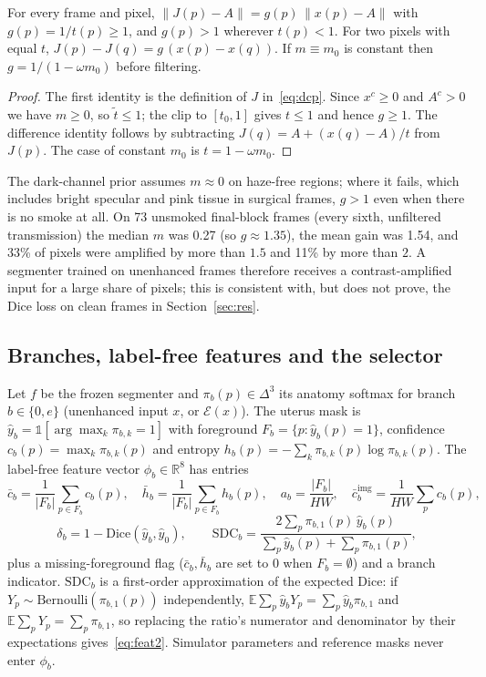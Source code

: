 \documentclass{midl}
\begin{document}
\begin{proposition}\label{prop:dcp}
For every frame and pixel, $\|J(p)-A\|=g(p)\,\|x(p)-A\|$ with $g(p)=1/t(p)\ge 1$, and $g(p)>1$ wherever $t(p)<1$. For two pixels with equal $t$, $J(p)-J(q)=g\,(x(p)-x(q))$. If $m\equiv m_0$ is constant then $g=1/(1-\omega m_0)$ before filtering.
\end{proposition}
\begin{proof}
The first identity is the definition of $J$ in~\eqref{eq:dcp}. Since $x^{c}\ge 0$ and $A^{c}>0$ we have $m\ge 0$, so $\tilde t\le 1$; the clip to $[t_0,1]$ gives $t\le 1$ and hence $g\ge 1$. The difference identity follows by subtracting $J(q)=A+(x(q)-A)/t$ from $J(p)$. The case of constant $m_0$ is $t=1-\omega m_0$.
\end{proof}
\noindent The dark-channel prior assumes $m\approx 0$ on haze-free regions; where it fails, which includes bright specular and pink tissue in surgical frames, $g>1$ even when there is no smoke at all. On 73 unsmoked final-block frames (every sixth, unfiltered transmission) the median $m$ was 0.27 (so $g\approx1.35$), the mean gain was 1.54, and 33\% of pixels were amplified by more than $1.5$ and 11\% by more than $2$. A segmenter trained on unenhanced frames therefore receives a contrast-amplified input for a large share of pixels; this is consistent with, but does not prove, the Dice loss on clean frames in Section~\ref{sec:res}.

\subsection{Branches, label-free features and the selector}
Let $f$ be the frozen segmenter and $\pi_b(p)\in\Delta^{3}$ its anatomy softmax for branch $b\in\{0,e\}$ (unenhanced input $x$, or $\mathcal{E}(x)$). The uterus mask is $\hat y_b=\mathbb{1}[\arg\max_k\pi_{b,k}=1]$ with foreground $F_b=\{p:\hat y_b(p)=1\}$, confidence $c_b(p)=\max_k\pi_{b,k}(p)$ and entropy $h_b(p)=-\sum_k\pi_{b,k}(p)\log\pi_{b,k}(p)$. The label-free feature vector $\phi_b\in\mathbb{R}^{8}$ has entries
\begin{equation}
\bar c_b=\frac{1}{|F_b|}\sum_{p\in F_b}c_b(p),\quad
\bar h_b=\frac{1}{|F_b|}\sum_{p\in F_b}h_b(p),\quad
a_b=\frac{|F_b|}{HW},\quad
\bar c^{\mathrm{img}}_b=\frac{1}{HW}\sum_{p}c_b(p),
\label{eq:feat1}
\end{equation}
\begin{equation}
\delta_b=1-\mathrm{Dice}(\hat y_b,\hat y_0),\qquad
\mathrm{SDC}_b=\frac{2\sum_p\pi_{b,1}(p)\,\hat y_b(p)}{\sum_p\hat y_b(p)+\sum_p\pi_{b,1}(p)},
\label{eq:feat2}
\end{equation}
plus a missing-foreground flag ($\bar c_b,\bar h_b$ are set to $0$ when $F_b=\emptyset$) and a branch indicator. $\mathrm{SDC}_b$ is a first-order approximation of the expected Dice: if $Y_p\sim\mathrm{Bernoulli}(\pi_{b,1}(p))$ independently, $\mathbb{E}\sum_p\hat y_bY_p=\sum_p\hat y_b\pi_{b,1}$ and $\mathbb{E}\sum_pY_p=\sum_p\pi_{b,1}$, so replacing the ratio's numerator and denominator by their expectations gives~\eqref{eq:feat2}. Simulator parameters and reference masks never enter $\phi_b$.
\end{document}
